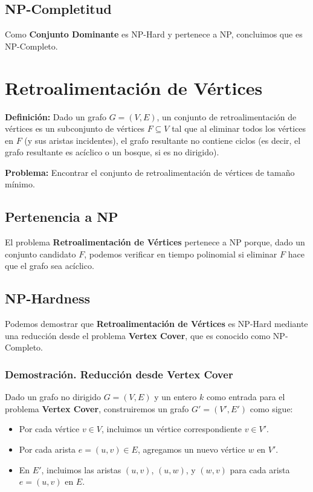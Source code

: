 \documentclass[a4paper,12pt]{article}
\begin{document}
\subsection{NP-Completitud}

Como \textbf{Conjunto Dominante} es NP-Hard y pertenece a NP, concluimos que es NP-Completo.


\section{Retroalimentaci\'on de V\'ertices}


\textbf{Definici\'on:} Dado un grafo $G = (V, E)$, un conjunto de retroalimentaci\'on de v\'ertices es un subconjunto de v\'ertices $F \subseteq V$ tal que al eliminar todos los v\'ertices en $F$ (y sus aristas incidentes), el grafo resultante no contiene ciclos (es decir, el grafo resultante es ac\'iclico o un bosque, si es no dirigido).

\textbf{Problema:} Encontrar el conjunto de retroalimentaci\'on de v\'ertices de tama\~no m\'inimo.

\subsection{Pertenencia a NP}
El problema \textbf{Retroalimentaci\'on de V\'ertices} pertenece a NP porque, dado un conjunto candidato $F$, podemos verificar en tiempo polinomial si eliminar $F$ hace que el grafo sea ac\'iclico. 

\subsection{NP-Hardness}
Podemos demostrar que \textbf{Retroalimentaci\'on de V\'ertices} es NP-Hard mediante una reducci\'on desde el problema \textbf{Vertex Cover}, que es conocido como NP-Completo.

\subsubsection{Demostraci\'on. Reducci\'on desde Vertex Cover}
Dado un grafo no dirigido $G = (V, E)$ y un entero $k$ como entrada para el problema \textbf{Vertex Cover}, construiremos un grafo $G' = (V', E')$ como sigue:
\begin{itemize}
    \item Por cada v\'ertice $v \in V$, incluimos un v\'ertice correspondiente $v \in V'$.
    \item Por cada arista $e = (u, v) \in E$, agregamos un nuevo v\'ertice $w$ en $V'$.
    \item En $E'$, incluimos las aristas $(u, v)$, $(u, w)$, y $(w, v)$ para cada arista $e = (u, v)$ en $E$.
\end{itemize}
\end{document}
